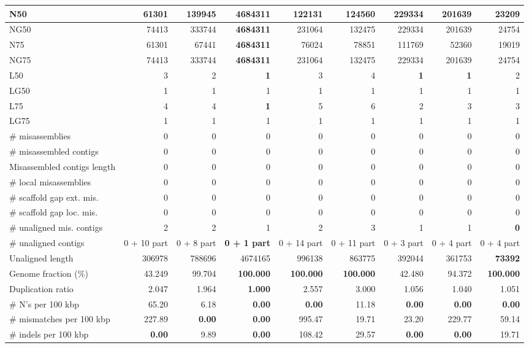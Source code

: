\documentclass[12pt,a4paper]{article}
\begin{document}
\begin{table}[ht]
\begin{center}
\begin{tabular}{|l*{8}{|r}|}
N50 & 61301 & 139945 & {\bf 4684311} & 122131 & 124560 & 229334 & 201639 & 23209 \\ \hline
NG50 & 74413 & 333744 & {\bf 4684311} & 231064 & 132475 & 229334 & 201639 & 24754 \\ \hline
N75 & 61301 & 67441 & {\bf 4684311} & 76024 & 78851 & 111769 & 52360 & 19019 \\ \hline
NG75 & 74413 & 333744 & {\bf 4684311} & 231064 & 132475 & 229334 & 201639 & 24754 \\ \hline
L50 & 3 & 2 & {\bf 1} & 3 & 4 & {\bf 1} & {\bf 1} & 2 \\ \hline
LG50 & 1 & 1 & 1 & 1 & 1 & 1 & 1 & 1 \\ \hline
L75 & 4 & 4 & {\bf 1} & 5 & 6 & 2 & 3 & 3 \\ \hline
LG75 & 1 & 1 & 1 & 1 & 1 & 1 & 1 & 1 \\ \hline
\# misassemblies & 0 & 0 & 0 & 0 & 0 & 0 & 0 & 0 \\ \hline
\# misassembled contigs & 0 & 0 & 0 & 0 & 0 & 0 & 0 & 0 \\ \hline
Misassembled contigs length & 0 & 0 & 0 & 0 & 0 & 0 & 0 & 0 \\ \hline
\# local misassemblies & 0 & 0 & 0 & 0 & 0 & 0 & 0 & 0 \\ \hline
\# scaffold gap ext. mis. & 0 & 0 & 0 & 0 & 0 & 0 & 0 & 0 \\ \hline
\# scaffold gap loc. mis. & 0 & 0 & 0 & 0 & 0 & 0 & 0 & 0 \\ \hline
\# unaligned mis. contigs & 2 & 2 & 1 & 2 & 3 & 1 & 1 & {\bf 0} \\ \hline
\# unaligned contigs & 0 + 10 part & 0 + 8 part & {\bf 0 + 1 part} & 0 + 14 part & 0 + 11 part & 0 + 3 part & 0 + 4 part & 0 + 4 part \\ \hline
Unaligned length & 306978 & 788696 & 4674165 & 996138 & 863775 & 392044 & 361753 & {\bf 73392} \\ \hline
Genome fraction (\%) & 43.249 & 99.704 & {\bf 100.000} & {\bf 100.000} & {\bf 100.000} & 42.480 & 94.372 & {\bf 100.000} \\ \hline
Duplication ratio & 2.047 & 1.964 & {\bf 1.000} & 2.557 & 3.000 & 1.056 & 1.040 & 1.051 \\ \hline
\# N's per 100 kbp & 65.20 & 6.18 & {\bf 0.00} & {\bf 0.00} & 11.18 & {\bf 0.00} & {\bf 0.00} & {\bf 0.00} \\ \hline
\# mismatches per 100 kbp & 227.89 & {\bf 0.00} & {\bf 0.00} & 995.47 & 19.71 & 23.20 & 229.77 & 59.14 \\ \hline
\# indels per 100 kbp & {\bf 0.00} & 9.89 & {\bf 0.00} & 108.42 & 29.57 & {\bf 0.00} & {\bf 0.00} & 19.71 \\ \hline

\end{tabular}
\end{center}
\end{table}
\end{document}
